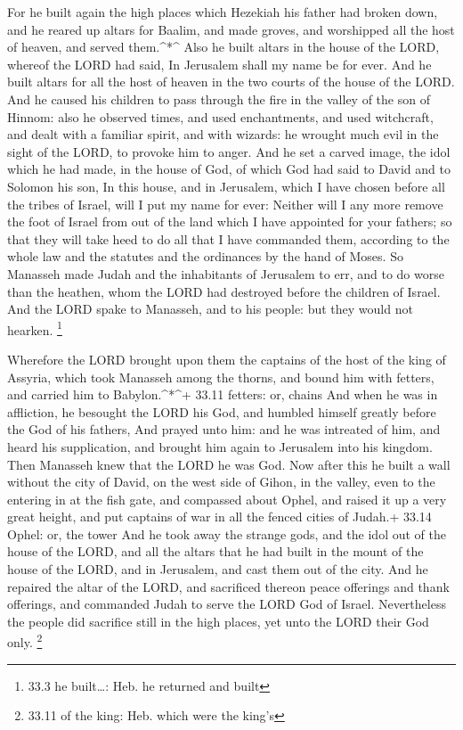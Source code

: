  For he built again the high places which Hezekiah his
father had broken down, and he reared up altars for Baalim, and made
groves, and worshipped all the host of heaven, and served them.\^{}*\^{}
 Also he built altars in the house of the LORD, whereof the
LORD had said, In Jerusalem shall my name be for ever.  And
he built altars for all the host of heaven in the two courts of the
house of the LORD.  And he caused his children to pass
through the fire in the valley of the son of Hinnom: also he observed
times, and used enchantments, and used witchcraft, and dealt with a
familiar spirit, and with wizards: he wrought much evil in the sight of
the LORD, to provoke him to anger.  And he set a carved
image, the idol which he had made, in the house of God, of which God had
said to David and to Solomon his son, In this house, and in Jerusalem,
which I have chosen before all the tribes of Israel, will I put my name
for ever:  Neither will I any more remove the foot of Israel
from out of the land which I have appointed for your fathers; so that
they will take heed to do all that I have commanded them, according to
the whole law and the statutes and the ordinances by the hand of Moses.
 So Manasseh made Judah and the inhabitants of Jerusalem to
err, and to do worse than the heathen, whom the LORD had destroyed
before the children of Israel.  And the LORD spake to
Manasseh, and to his people: but they would not hearken. \footnote{33.3
  he built\ldots: Heb. he returned and built}

 Wherefore the LORD brought upon them the captains of the
host of the king of Assyria, which took Manasseh among the thorns, and
bound him with fetters, and carried him to Babylon.\^{}*\^{}+ 33.11
fetters: or, chains  And when he was in affliction, he
besought the LORD his God, and humbled himself greatly before the God of
his fathers,  And prayed unto him: and he was intreated of
him, and heard his supplication, and brought him again to Jerusalem into
his kingdom. Then Manasseh knew that the LORD he was God. 
Now after this he built a wall without the city of David, on the west
side of Gihon, in the valley, even to the entering in at the fish gate,
and compassed about Ophel, and raised it up a very great height, and put
captains of war in all the fenced cities of Judah.+ 33.14 Ophel: or, the
tower  And he took away the strange gods, and the idol out
of the house of the LORD, and all the altars that he had built in the
mount of the house of the LORD, and in Jerusalem, and cast them out of
the city.  And he repaired the altar of the LORD, and
sacrificed thereon peace offerings and thank offerings, and commanded
Judah to serve the LORD God of Israel.  Nevertheless the
people did sacrifice still in the high places, yet unto the LORD their
God only. \footnote{33.11 of the king: Heb. which were the king's}

